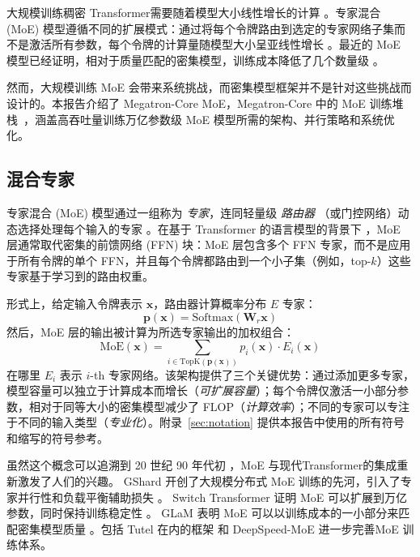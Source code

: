 \documentclass[10pt,logo,copyright]{nvidiatechreport_zh}
\begin{document}
大规模训练稠密 Transformer需要随着模型大小线性增长的计算 \cite{kaplan2020scaling,hoffmann2022chinchilla}。专家混合 (MoE) 模型遵循不同的扩展模式：通过将每个令牌路由到选定的专家网络子集而不是激活所有参数，每个令牌的计算量随模型大小呈亚线性增长 \cite{shazeer2017,fedus2022switchtransformersscalingtrillion}。最近的 MoE 模型已经证明，相对于质量匹配的密集模型，训练成本降低了几个数量级 \cite{jiang2024mixtralexperts,deepseekai2025deepseekv3technicalreport,Cai_2025}。

然而，大规模训练 MoE 会带来系统挑战，而密集模型框架并不是针对这些挑战而设计的。本报告介绍了 Megatron-Core MoE，Megatron-Core 中的 MoE 训练堆栈~\cite{shoeybi2020megatronlmtrainingmultibillionparameter}，涵盖高吞吐量训练万亿参数级 MoE 模型所需的架构、并行策略和系统优化。

\subsection{混合专家}

专家混合 (MoE) 模型通过一组称为 \emph{专家}，连同轻量级 \emph{路由器} （或门控网络）动态选择处理每个输入的专家 \cite{shazeer2017,jacobs1991adaptive,eigen2013learning}。在基于 Transformer 的语言模型的背景下 \cite{vaswani2017attention}，MoE 层通常取代密集的前馈网络 (FFN) 块：MoE 层包含多个 FFN 专家，而不是应用于所有令牌的单个 FFN，并且每个令牌都路由到一个小子集（例如，top-$k$）这些专家基于学习到的路由权重。

形式上，给定输入令牌表示 $\mathbf{x}$，路由器计算概率分布 $E$ 专家：
\[
\mathbf{p}(\mathbf{x}) = \text{Softmax}(\mathbf{W}_r \mathbf{x})
\]
然后，MoE 层的输出被计算为所选专家输出的加权组合：
\[
\text{MoE}(\mathbf{x}) = \sum_{i \in \text{TopK}(\mathbf{p}(\mathbf{x}))} p_i(\mathbf{x}) \cdot E_i(\mathbf{x})
\]
在哪里 $E_i$ 表示 $i$-th 专家网络。该架构提供了三个关键优势：通过添加更多专家，模型容量可以独立于计算成本而增长（\emph{可扩展容量}）；每个令牌仅激活一小部分参数，相对于同等大小的密集模型减少了 FLOP（\emph{计算效率}）；不同的专家可以专注于不同的输入类型（\emph{专业化}）。附录~\ref{sec:notation} 提供本报告中使用的所有符号和缩写的符号参考。

虽然这个概念可以追溯到 20 世纪 90 年代初 \cite{jacobs1991adaptive,eigen2013learning}，MoE 与现代Transformer的集成重新激发了人们的兴趣。 GShard 开创了大规模分布式 MoE 训练的先河，引入了专家并行性和负载平衡辅助损失 \cite{lepikhin2020gshard}。 Switch Transformer 证明 MoE 可以扩展到万亿参数，同时保持训练稳定性 \cite{fedus2022switchtransformersscalingtrillion}。 GLaM 表明 MoE 可以以训练成本的一小部分来匹配密集模型质量 \cite{du2022glamefficientscalinglanguage}。包括 Tutel 在内的框架 \cite{hwang2023tutel} 和 DeepSpeed-MoE \cite{rajbhandari2022deepspeedmoe} 进一步完善MoE 训练体系。
\end{document}
